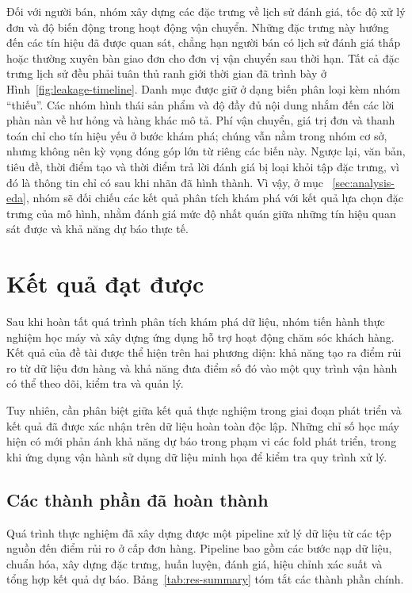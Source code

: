 \documentclass[12pt,a4paper]{report}
\begin{document}
Đối với người bán, nhóm xây dựng các đặc trưng về lịch sử đánh giá, tốc độ xử lý đơn và độ biến động trong hoạt động vận chuyển. Những đặc trưng này hướng đến các tín hiệu đã được quan sát, chẳng hạn người bán có lịch sử đánh giá thấp hoặc thường xuyên bàn giao đơn cho đơn vị vận chuyển sau thời hạn. Tất cả đặc trưng lịch sử đều phải tuân thủ ranh giới thời gian đã trình bày ở Hình~\ref{fig:leakage-timeline}. Danh mục được giữ ở dạng biến phân loại kèm nhóm ``thiếu''. Các nhóm hình thái sản phẩm và độ đầy đủ nội dung nhắm đến các lời phàn nàn về hư hỏng và hàng khác mô tả. Phí vận chuyển, giá trị đơn và thanh toán chỉ cho tín hiệu yếu ở bước khám phá; chúng vẫn nằm trong nhóm cơ sở, nhưng không nên kỳ vọng đóng góp lớn từ riêng các biến này. Ngược lại, văn bản, tiêu đề, thời điểm tạo và thời điểm trả lời đánh giá bị loại khỏi tập đặc trưng, vì đó là thông tin chỉ có sau khi nhãn đã hình thành. Vì vậy, ở mục ~\ref{sec:analysis-eda}, nhóm sẽ đối chiếu các kết quả phân tích khám phá với kết quả lựa chọn đặc trưng của mô hình, nhằm đánh giá mức độ nhất quán giữa những tín hiệu quan sát được và khả năng dự báo thực tế.

\section{Kết quả đạt được}\label{sec:results}
Sau khi hoàn tất quá trình phân tích khám phá dữ liệu, nhóm tiến hành thực nghiệm học máy và xây dựng ứng dụng hỗ trợ hoạt động chăm sóc khách hàng. Kết quả của đề tài được thể hiện trên hai phương diện: khả năng tạo ra điểm rủi ro từ dữ liệu đơn hàng và khả năng đưa điểm số đó vào một quy trình vận hành có thể theo dõi, kiểm tra và quản lý.

Tuy nhiên, cần phân biệt giữa kết quả thực nghiệm trong giai đoạn phát triển và kết quả đã được xác nhận trên dữ liệu hoàn toàn độc lập. Những chỉ số học máy hiện có mới phản ánh khả năng dự báo trong phạm vi các fold phát triển, trong khi ứng dụng vận hành sử dụng dữ liệu minh họa để kiểm tra quy trình xử lý.
\subsection{Các thành phần đã hoàn thành}\label{subsec:res-summary}

Quá trình thực nghiệm đã xây dựng được một pipeline xử lý dữ liệu từ các tệp nguồn đến điểm rủi ro ở cấp đơn hàng. Pipeline bao gồm các bước nạp dữ liệu, chuẩn hóa, xây dựng đặc trưng, huấn luyện, đánh giá, hiệu chỉnh xác suất và tổng hợp kết quả dự báo. Bảng~\ref{tab:res-summary} tóm tắt các thành phần chính. 
\end{document}
